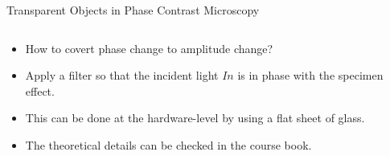 \begin{frame}{Transparent Objects in Phase Contrast Microscopy}
	\begin{columns}[T,onlytextwidth]
		\begin{column}{0.6\textwidth}
			\begin{itemize}
				\item<1-> How to covert phase change to amplitude change?
				\item<2-> Apply a filter so that the incident light $In$ is in phase with the specimen effect.
				\item<3-> This can be done at the hardware-level by using a flat sheet of glass.
				\item<4-> The theoretical details can be checked in the course book.
			\end{itemize}
		\end{column}


		\begin{column}{0.4\textwidth}
		\end{column}



	\end{columns}
\end{frame}


